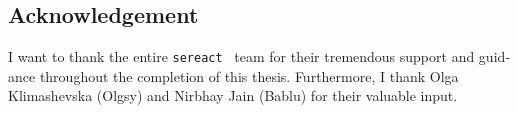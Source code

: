 \cleardoublepage

\begin{otherlanguage}{english}
    \chapter*{Acknowledgement}

    I want to thank the entire \texttt{sereact}~\cite{sereact} team for their tremendous support and guidance throughout the completion of this thesis. Furthermore, I thank Olga Klimashevska (Olgsy) and Nirbhay Jain (Bablu) for their valuable input.




\end{otherlanguage}

\cleardoublepage